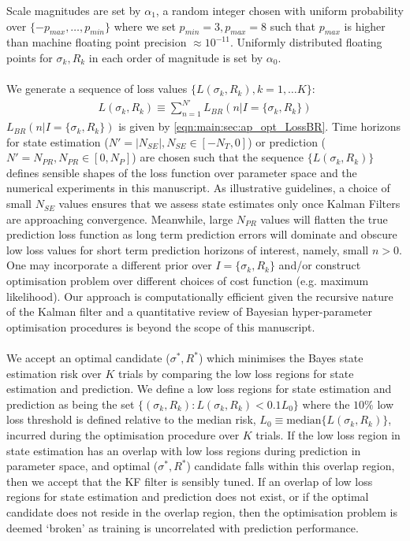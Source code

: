 \documentclass[pra, reprint]{revtex4-1}
\begin{document}
Scale magnitudes are set by $\alpha_1$, a random integer chosen with uniform probability over $\{ -p_{max}, \hdots, p_{min} \}$ where we set $p_{min} = 3, p_{max} = 8$  such that $p_{max}$ is higher than machine floating point precision $\approx 10^{-11}$. Uniformly distributed floating points for $\sigma_k, R_k $ in each order of magnitude is set by $\alpha_0$. 
\\
\\
We generate a sequence of loss values $\{L(\sigma_k, R_k), k = 1, \hdots K\}$:
\begin{align}
L(\sigma_k, R_k) \equiv  \sum_{n=1}^{N'} L_{BR}(n | I= \{\sigma_k, R_k \})
\end{align}
$L_{BR}(n | I= \{\sigma_k, R_k \})$ is given by \cref{eqn:main:sec:ap_opt_LossBR}. Time horizons for state estimation ($N' = |N_{SE}| , N_{SE} \in  [-N_{T}, 0]$) or prediction ($N' = N_{PR}, N_{PR}  \in [0, N_{P}]$) are chosen such that the sequence $\{L(\sigma_k, R_k) \}$ defines sensible shapes of the loss function over parameter space and the numerical experiments in this manuscript. As illustrative guidelines, a choice of small $N_{SE}$ values ensures that we assess state estimates only once Kalman Filters are approaching convergence. Meanwhile, large $N_{PR}$ values will flatten the true prediction loss function as long term prediction errors will dominate and obscure low loss values for short term prediction horizons of interest, namely, small $n>0$. One may incorporate a different prior over $I= \{\sigma_k, R_k \}$ and/or construct optimisation problem over different choices of cost function (e.g. maximum likelihood). Our approach is computationally efficient given the recursive nature of the Kalman filter and a quantitative review of Bayesian hyper-parameter optimisation procedures is beyond the scope of this manuscript. 
\\
\\
We accept an optimal candidate ($\sigma^*, R^*$) which minimises the Bayes state estimation risk over $K$ trials by comparing the low loss regions for state estimation and prediction. We define a low loss regions for state estimation and prediction as being the set $ \{ (\sigma_k, R_k) : L(\sigma_k, R_k) < 0.1 L_0 \}$ where the $10 \%$ low loss threshold is defined relative to the median risk, $L_0 \equiv \text{median}\{  L(\sigma_k, R_k) \}$, incurred during the optimisation procedure over $K$ trials. If the low loss region in state estimation has an overlap with low loss regions during prediction in parameter space, and optimal ($\sigma^*, R^*$) candidate falls within this overlap region, then we accept that the KF filter is sensibly tuned. If an overlap of low loss regions for state estimation and prediction does not exist, or if the optimal candidate does not reside in the overlap region, then the optimisation problem is deemed `broken' as training is uncorrelated with prediction performance. 
\end{document}
